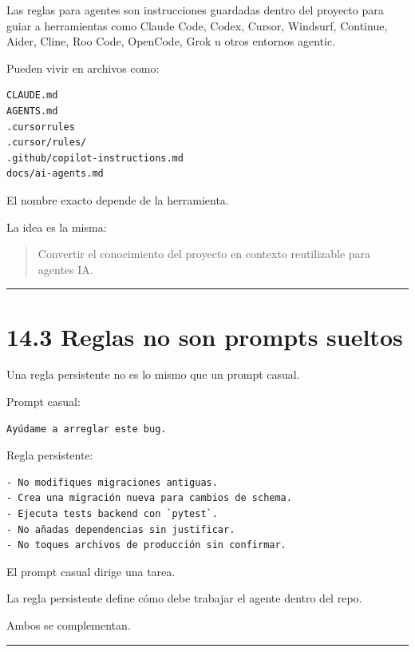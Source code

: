 Las reglas para agentes son instrucciones guardadas dentro del proyecto
para guiar a herramientas como Claude Code, Codex, Cursor, Windsurf,
Continue, Aider, Cline, Roo Code, OpenCode, Grok u otros entornos
agentic.

Pueden vivir en archivos como:

\begin{lstlisting}
CLAUDE.md
AGENTS.md
.cursorrules
.cursor/rules/
.github/copilot-instructions.md
docs/ai-agents.md
\end{lstlisting}

El nombre exacto depende de la herramienta.

La idea es la misma:

\begin{quote}
Convertir el conocimiento del proyecto en contexto reutilizable para
agentes IA.
\end{quote}

\begin{center}\rule{0.5\linewidth}{0.5pt}\end{center}

\section{14.3 Reglas no son prompts
sueltos}\label{reglas-no-son-prompts-sueltos}

Una regla persistente no es lo mismo que un prompt casual.

Prompt casual:

\begin{lstlisting}
Ayúdame a arreglar este bug.
\end{lstlisting}

Regla persistente:

\begin{lstlisting}
- No modifiques migraciones antiguas.
- Crea una migración nueva para cambios de schema.
- Ejecuta tests backend con `pytest`.
- No añadas dependencias sin justificar.
- No toques archivos de producción sin confirmar.
\end{lstlisting}

El prompt casual dirige una tarea.

La regla persistente define cómo debe trabajar el agente dentro del
repo.

Ambos se complementan.

\begin{center}\rule{0.5\linewidth}{0.5pt}\end{center}

